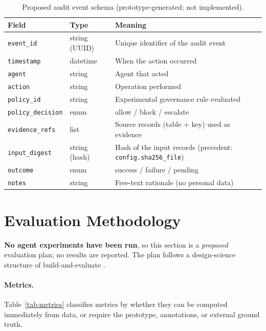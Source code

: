 \documentclass[11pt,a4paper]{article}
\newcommand{\code}[1]{\texttt{#1}}
\begin{document}
\begin{table}[H]
\centering
\small
\caption{Proposed audit event schema (prototype-generated; not implemented).}
\label{tab:audit}
\begin{tabular}{L{3.4cm}L{3.6cm}L{7.0cm}}
\toprule
\textbf{Field} & \textbf{Type} & \textbf{Meaning} \\
\midrule
\code{event\_id} & string (UUID) & Unique identifier of the audit event \\
\code{timestamp} & datetime & When the action occurred \\
\code{agent} & string & Agent that acted \\
\code{action} & string & Operation performed \\
\code{policy\_id} & string & Experimental governance rule evaluated \\
\code{policy\_decision} & enum & allow / block / escalate \\
\code{evidence\_refs} & list & Source records (table + key) used as evidence \\
\code{input\_digest} & string (hash) & Hash of the input records (precedent: \code{config.sha256\_file}) \\
\code{outcome} & enum & success / failure / pending \\
\code{notes} & string & Free-text rationale (no personal data) \\
\bottomrule
\end{tabular}
\end{table}

\section{Evaluation Methodology}
\textbf{No agent experiments have been run}, so this section is a \emph{proposed} evaluation plan; no results are reported. The plan follows a design-science structure of build-and-evaluate \cite{hevner2004}.

\paragraph{Metrics.} Table~\ref{tab:metrics} classifies metrics by whether they can be computed immediately from data, or require the prototype, annotations, or external ground truth.
\end{document}
